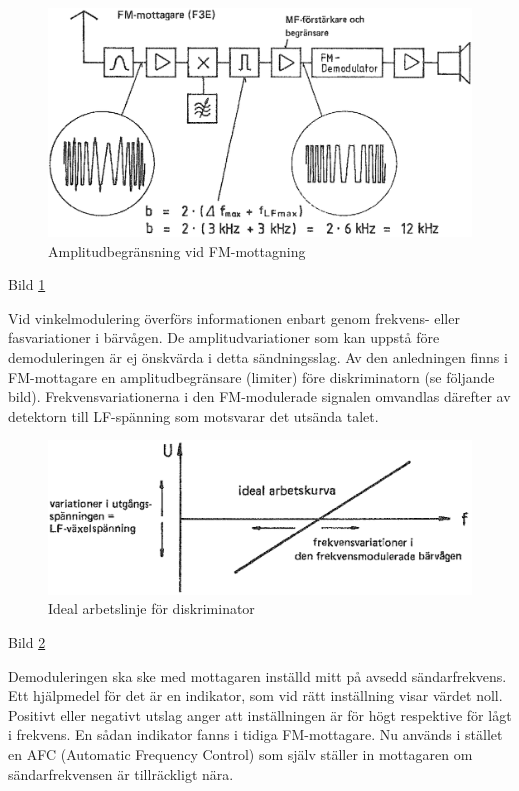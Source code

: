 \begin{figure}
\includegraphics[width=\textwidth]{images/cropped_pdfs/bild_2_3-57.pdf}
\caption{Amplitudbegränsning vid FM-mottagning}
\label{fig:BildII3-57}
\end{figure}

Bild \ref{fig:BildII3-57}

Vid vinkelmodulering överförs informationen enbart genom frekvens-
eller fasvariationer i bärvågen. De amplitudvariationer som kan uppstå
före demoduleringen är ej önskvärda i detta sändningsslag. Av den
anledningen finns i FM-mottagare en amplitudbegränsare (limiter) före
diskriminatorn (se följande bild). Frekvensvariationerna i den
FM-modulerade signalen omvandlas därefter av detektorn till
LF-spänning som motsvarar det utsända talet.

\begin{figure}
\includegraphics[width=\textwidth]{images/cropped_pdfs/bild_2_3-58.pdf}
\caption{Ideal arbetslinje för diskriminator}
\label{fig:BildII3-58}
\end{figure}

Bild \ref{fig:BildII3-58}

Demoduleringen ska ske med mottagaren inställd mitt på avsedd
sändarfrekvens. Ett hjälpmedel för det är en indikator, som vid rätt
inställning visar värdet noll. Positivt eller negativt utslag anger
att inställningen är för högt respektive för lågt i frekvens. En sådan
indikator fanns i tidiga FM-mottagare. Nu används i stället en AFC
(Automatic Frequency Control) som själv ställer in mottagaren
om sändarfrekvensen är tillräckligt nära.


